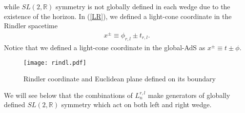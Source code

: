 \documentclass[11pt,a4paper]{article}
\def\ba{\begin{eqnarray}}
\def\ea{\end{eqnarray}}
\begin{document}
\eal
while $SL(2,\mathbb{R})$ symmetry is not globally defined in each wedge due to the existence of the horizon. In (\ref{LR}), we defined a light-cone coordinate in the Rindler spacetime
\ba
x^{\pm}\equiv\phi_{r,l}\pm t_{r,l}.
\ea
Notice that we defined a light-cone coordinate in the global-AdS as $x^{\pm}\equiv t\pm \phi$.
\begin{figure}
\begin{center}
  \texttt{[image: rindl.pdf]}
  \caption{Rindler coordinate and Euclidean plane defined on its boundary}
 \end{center}
\end{figure}
We will see below that the combinations of $L^{r,l}_n$ make generators of globally defined $SL(2,\mathbb{R})$ symmetry which act on both left and right wedge.
\end{document}
